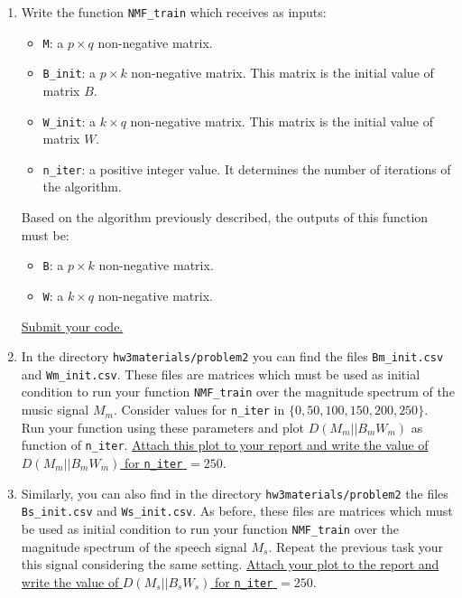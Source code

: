 \begin{enumerate}
    \item Write the function \texttt{NMF\_train} which receives as inputs:
    \begin{itemize}
        \item \texttt{M}: a $p \times q$ non-negative matrix. 
        \item \texttt{B\_init}:  a $p \times k$ non-negative matrix. This matrix is the initial value of matrix $B$.
        \item \texttt{W\_init}: a $k \times q$ non-negative matrix. This matrix is the initial value of matrix $W$.
        \item \texttt{n\_iter}: a positive integer value. It determines the number of iterations of the algorithm.
    \end{itemize}
    Based on the algorithm previously described, the outputs of this function must be:
    \begin{itemize}
        \item \texttt{B}: a $p \times k$ non-negative matrix. 
        \item \texttt{W}: a $k \times q$ non-negative matrix.
    \end{itemize}
    \ul{Submit your code.}
    
    \item In the directory \texttt{hw3materials/problem2} you can find the files \texttt{Bm\_init.csv} and \texttt{Wm\_init.csv}. These files are matrices which must be used as initial condition to run your function \texttt{NMF\_train} over the magnitude spectrum of the music signal $M_m$. Consider values for \texttt{n\_iter} in $\{0, 50, 100, 150, 200, 250\}$. Run your function using these parameters and plot $D(M_m || B_mW_m)$ as function of \texttt{n\_iter}. \ul{Attach this plot to your report and write the value of $D(M_m||B_mW_m)$ for \texttt{n\_iter} $= 250$}.
    
    \item Similarly, you can also find in the directory \texttt{hw3materials/problem2} the files \texttt{Bs\_init.csv} and \texttt{Ws\_init.csv}. As before, these files are matrices which must be used as initial condition to run your function \texttt{NMF\_train} over the magnitude spectrum of the speech signal $M_s$. Repeat the previous task your this signal considering the same setting. \ul{Attach your plot to the report and write the value of $D(M_s||B_sW_s)$ for \texttt{n\_iter} $= 250$}. 
    
\end{enumerate}


